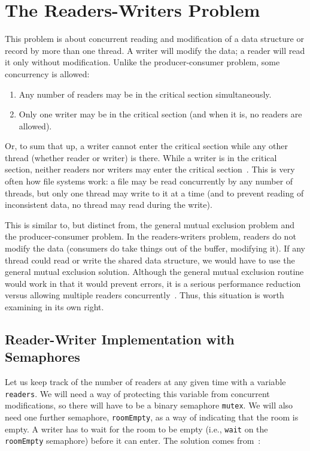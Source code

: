 




\section*{The Readers-Writers Problem}

This problem is about concurrent reading and modification of a data structure or record by more than one thread. A writer will modify the data; a reader will read it only without modification. Unlike the producer-consumer problem, some concurrency is allowed:

\begin{enumerate}
	\item Any number of readers may be in the critical section simultaneously.
	\item Only one writer may be in the critical section (and when it is, no readers are allowed).
\end{enumerate}

Or, to sum that up, a writer cannot enter the critical section while any other thread (whether reader or writer) is there. While a writer is in the critical section, neither readers nor writers may enter the critical section~\cite{lbs}. This is very often how file systems work: a file may be read concurrently by any number of threads, but only one thread may write to it at a time (and to prevent reading of inconsistent data, no thread may read during the write).

This is similar to, but distinct from, the general mutual exclusion problem and the producer-consumer problem. In the readers-writers problem, readers do not modify the data (consumers do take things out of the buffer, modifying it). If any thread could read or write the shared data structure, we would have to use the general mutual exclusion solution. Although the general mutual exclusion routine would work in that it would prevent errors, it is a serious performance reduction versus allowing multiple readers concurrently~\cite{osi}. Thus, this situation is worth examining in its own right.

\subsection*{Reader-Writer Implementation with Semaphores}

Let us keep track of the number of readers at any given time with a variable \texttt{readers}. We will need a way of protecting this variable from concurrent modifications, so there will have to be a binary semaphore \texttt{mutex}. We will also need one further semaphore, \texttt{roomEmpty}, as a way of indicating that the room is empty. A writer has to wait for the room to be empty (i.e., \texttt{wait} on the \texttt{roomEmpty} semaphore) before it can enter. The solution comes from~\cite{lbs}:

